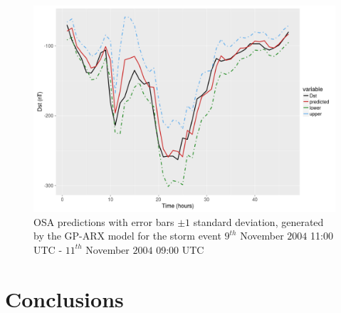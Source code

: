 \documentclass[referee,a4paper,12pt,traditabstract]{swsc}
\begin{document}
\begin{linenumbers}
\begin{figure}
   \centering
   \includegraphics[width=\textwidth]{Compare_pred_err_bar.png}
      \caption{OSA predictions with error bars $\pm 1$ standard deviation, generated by the GP-ARX model for the storm event $9^{th}$ November $2004$ 11:00 UTC - $11^{th}$ November $2004$ 09:00 UTC}
         \label{fig:predictionswitherrorbar}
\end{figure}

  
\section{Conclusions}


\end{linenumbers}
\end{document}
